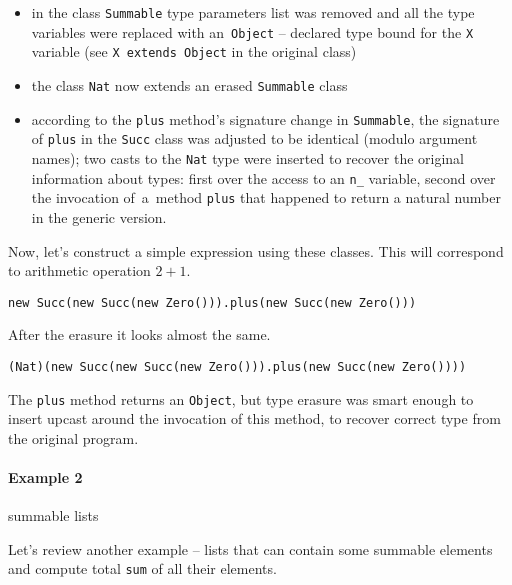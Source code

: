 \documentclass{article}[12pt]
\begin{document}
\begin{itemize}
\item in the class \texttt{Summable} type parameters list was removed
   and all the type variables were replaced with an~\texttt{Object} --
   declared type bound for the \texttt{X} variable (see
   \texttt{X extends Object} in the original class)
\item the class \texttt{Nat} now extends an erased \texttt{Summable}
  class
\item according to the \texttt{plus} method's signature change in
  \texttt{Summable}, the signature of \texttt{plus} in the \texttt{Succ}
  class was adjusted to be identical (modulo argument names);
  two casts to the \texttt{Nat} type were inserted to recover
  the original information about types: first over the access to 
  an \texttt{n\_} variable,
  second over the invocation of~a~method \texttt{plus} that
  happened to return a natural number in the generic version.
\end{itemize}

Now, let's construct a simple expression using these classes. This
will correspond to arithmetic operation $2 + 1$.
\begin{verbatim}
new Succ(new Succ(new Zero())).plus(new Succ(new Zero()))
\end{verbatim}
After the erasure it looks almost the same.
\begin{verbatim}
(Nat)(new Succ(new Succ(new Zero())).plus(new Succ(new Zero())))
\end{verbatim}
The \texttt{plus} method returns an \texttt{Object}, but
type erasure was smart enough to insert upcast around the invocation
of this method, to recover correct type from the original program.

\paragraph{Example 2} summable lists

Let's review another example -- lists that can contain some
summable elements and compute total \texttt{sum} of
all their elements.
\end{document}
